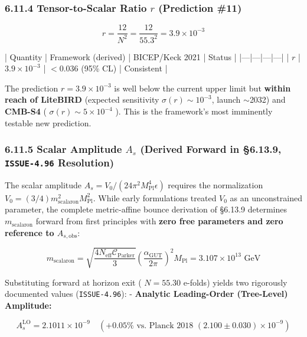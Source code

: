 \documentclass[11pt,a4paper]{article}
\theoremstyle{definition}
\theoremstyle{remark}
\begin{document}
\subsubsection{6.11.4 Tensor-to-Scalar Ratio $r$ (Prediction \#11)}


\begin{equation}
r = \frac{12}{N^2} = \frac{12}{55.3^2} = 3.9 \times 10^{-3}
\end{equation}


| Quantity | Framework (derived) | BICEP/Keck 2021 | Status |
|---|---|---|---|
| $r$ | $3.9 \times 10^{-3}$ | $< 0.036$ (95\% CL) | Consistent |

The prediction $r = 3.9 \times 10^{-3}$ is well below the current upper limit but \textbf{within reach of LiteBIRD} (expected sensitivity $\sigma(r) \sim 10^{-3}$, launch $\sim$2032) and \textbf{CMB-S4} ( $\sigma(r) \sim 5 \times 10^{-4}$ ). This is the framework's most imminently testable new prediction.

\subsubsection{6.11.5 Scalar Amplitude $A_s$ (Derived Forward in \S 6.13.9, \texttt{ISSUE-4.96} Resolution)}

The scalar amplitude $A_s = V_0 / (24\pi^2 M_{\text{Pl}}^4 \epsilon)$ requires the normalization $V_0 = (3/4)m_{\text{scalaron}}^2 M_{\text{Pl}}^2$. While early formulations treated $V_0$ as an unconstrained parameter, the complete metric-affine bounce derivation of \S 6.13.9 determines $m_{\text{scalaron}}$ forward from first principles with \textbf{zero free parameters and zero reference to $A_{s,\text{obs}}$}:


\begin{equation}
m_{\text{scalaron}} = \sqrt{\frac{4 N_{\text{eff}} \mathcal{C}_{\text{Parker}}}{3}} \left(\frac{\alpha_{\text{GUT}}}{2\pi}\right)^2 M_{\text{Pl}} = 3.107 \times 10^{13}\text{ GeV}
\end{equation}


Substituting forward at horizon exit ( $N = 55.30$ e-folds) yields two rigorously documented values (\texttt{ISSUE-4.96}):
- \textbf{Analytic Leading-Order (Tree-Level) Amplitude:}


\begin{equation}
A_s^{\text{LO}} = 2.1011 \times 10^{-9} \quad (\mathbf{+0.05\%} \text{ vs. Planck 2018 } (2.100 \pm 0.030) \times 10^{-9})
\end{equation}
\end{document}
